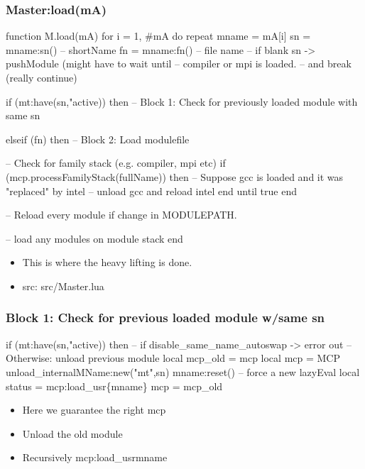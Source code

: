 \documentclass{beamer}
\begin{document}
\begin{frame}[fragile]
    \frametitle{Master:load(mA)}
 {\tiny
    \begin{semiverbatim}
function M.load(mA)
  for i = 1, #mA do
     repeat
        mname = mA[i]
        sn = mname:sn()  -- shortName
        fn = mname:fn()  -- file name
        -- if blank sn -> pushModule (might have to wait until
        -- compiler or mpi is loaded.
        -- and break (really continue)

        if (mt:have(sn,"active)) then
           -- Block 1: Check for previously loaded module with same sn

        elseif (fn) then
           -- Block 2: Load modulefile

        -- Check for family stack (e.g. compiler, mpi etc)
        if (mcp.processFamilyStack(fullName)) then
            -- Suppose gcc is loaded and it was "replaced" by intel
            -- unload gcc and reload intel
         end
      until true
   end         
     
   -- Reload every module if change in MODULEPATH.
     
   -- load any modules on module stack
end
    \end{semiverbatim}
}
  \begin{itemize}
    \item This is where the heavy lifting is done.
    \item src: src/Master.lua
  \end{itemize}

\end{frame}

\begin{frame}[fragile]
    \frametitle{Block 1: Check for previous loaded module w/same sn}
 {\tiny
    \begin{semiverbatim}
 if (mt:have(sn,"active)) then
    -- if disable_same_name_autoswap -> error out
    -- Otherwise: unload previous module
     local mcp_old = mcp
     local mcp     = MCP
     unload_internal{MName:new("mt",sn)}
     mname:reset()  -- force a new lazyEval
     local status = mcp:load_usr\{mname\}
     mcp          = mcp_old
    \end{semiverbatim}
}
  \begin{itemize}
    \item Here we guarantee the right mcp
    \item Unload the old module 
    \item Recursively mcp:load\_usr{mname} 
  \end{itemize}
\end{frame}
\end{document}

